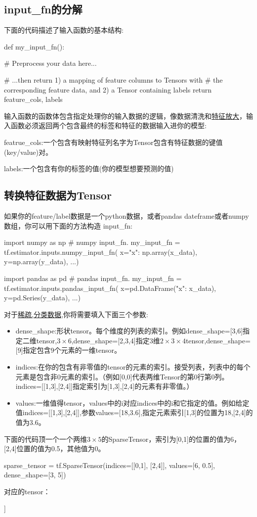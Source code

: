 \subsection{input\_fn的分解}
下面的代码描述了输入函数的基本结构:
\begin{python}
def my_input_fn():

    # Preprocess your data here...

    # ...then return 1) a mapping of feature columns to Tensors with
    # the corresponding feature data, and 2) a Tensor containing labels
    return feature_cols, labels
\end{python}
输入函数的函数体包含指定处理你的输入数据的逻辑，像数据清洗和\href{https://en.wikipedia.org/wiki/Feature_scaling}{特征放大}，输入函数必须返回两个包含最终的标签和特征的数据输入进你的模型:

featrue\_cols:一个包含有映射特征列名字为Tensor包含有特征数据的键值(key/value)对。

labels:一个包含有你的标签的值(你的模型想要预测的值)
\subsection{转换特征数据为Tensor}
如果你的feature/label数据是一个python数据，或者pandas dateframe或者numpy数组，你可以用下面的方法构造
input\_fn:
\begin{python}
import numpy as np
# numpy input_fn.
my_input_fn = tf.estimator.inputs.numpy_input_fn(
    x={"x": np.array(x_data)},
    y=np.array(y_data),
    ...)
\end{python}
\begin{python}
import pandas as pd
# pandas input_fn.
my_input_fn = tf.estimator.inputs.pandas_input_fn(
    x=pd.DataFrame({"x": x_data}),
    y=pd.Series(y_data),
    ...)
\end{python}
对于\href{https://en.wikipedia.org/wiki/Sparse_matrix}{稀疏,分类数据},你将需要填入下面三个参数:
\begin{itemize}
	\item dense\_shape:形状tensor。每个维度的列表的索引。例如dense\_shape=[3,6]指定二维tensor,$3\times6$,dense\_shape=[2,3,4]指定3维$2\times3\times4$tensor,dense\_shape=[9]指定包含9个元素的一维tensor。
	\item indices:在你的包含有非零值的tensor的元素的索引。接受列表，列表中的每个元素是包含非0元素的索引。（例如[0,0]代表两维Tensor的第0行第0列。indices=[[1,3],[2,4]]指定索引为[1,3],[2,4]的元素有非零值。）
	\item values:一维值得tensor，values中的i对应indices中的i和它指定的值。例如给定值indices=[[1,3],[2,4]],参数values=[18,3.6],指定元素索引[1,3]的位置为18,[2,4]的值为3.6。
\end{itemize}
下面的代码顶一个一个两维$3\times5$的SparseTensor，索引为[0,1]的位置的值为6，[2,4]位置的值为0.5，其他值为0。
\begin{python}
sparse_tensor = tf.SparseTensor(indices=[[0,1], [2,4]],
                                values=[6, 0.5],
                                dense_shape=[3, 5])
\end{python}
对应的tensor：
\begin{python}
[[0, 6, 0, 0, 0]
 [0, 0, 0, 0, 0]
 [0, 0, 0, 0, 0.5]]
\end{python}
